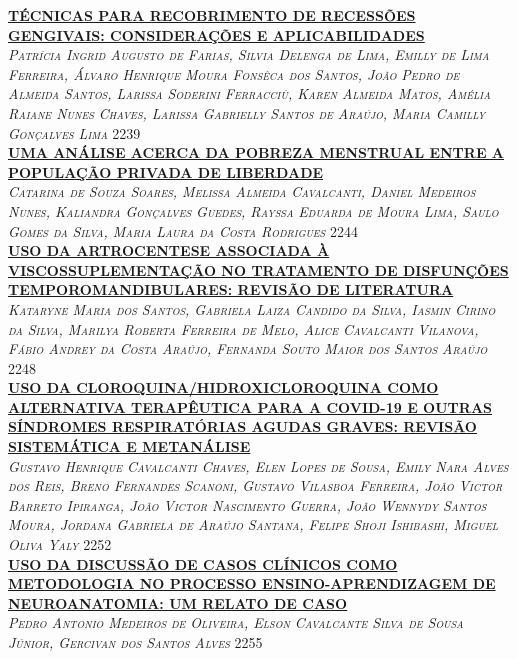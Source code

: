 \noindent \textsc{\hyperlink{trabalhos/251329.pdf.1}{\textbf{TÉCNICAS PARA RECOBRIMENTO DE RECESSÕES GENGIVAIS: CONSIDERAÇÕES E APLICABILIDADES}}}\\ 
\noindent \textsc{\textit{Patrícia Ingrid Augusto de Farias, Silvia Delenga de Lima, Emilly de Lima Ferreira, Álvaro Henrique Moura Fonsêca dos Santos, João Pedro de Almeida Santos, Larissa Soderini Ferracciù, Karen Almeida Matos, Amélia Raiane Nunes Chaves, Larissa Gabrielly Santos de Araújo, Maria Camilly Gonçalves Lima}} \hfill 2239\\ 

\noindent \textsc{\hyperlink{trabalhos/251701.pdf.1}{\textbf{UMA ANÁLISE ACERCA DA POBREZA MENSTRUAL ENTRE A POPULAÇÃO PRIVADA DE LIBERDADE}}}\\ 
\noindent \textsc{\textit{Catarina de Souza Soares, Melissa Almeida Cavalcanti, Daniel Medeiros Nunes, Kaliandra Gonçalves Guedes, Rayssa Eduarda de Moura Lima, Saulo Gomes da Silva, Maria Laura da Costa Rodrigues}} \hfill 2244\\ 

\noindent \textsc{\hyperlink{trabalhos/249981.pdf.1}{\textbf{USO DA ARTROCENTESE ASSOCIADA À VISCOSSUPLEMENTAÇÃO NO TRATAMENTO DE DISFUNÇÕES TEMPOROMANDIBULARES: REVISÃO DE LITERATURA }}}\\ 
\noindent \textsc{\textit{Kataryne Maria dos Santos, Gabriela Laiza Candido da Silva, Iasmin Cirino da Silva, Marilya Roberta Ferreira de Melo, Alice Cavalcanti Vilanova, Fábio Andrey da Costa Araújo, Fernanda Souto Maior dos Santos Araújo}} \hfill 2248\\ 

\noindent \textsc{\hyperlink{trabalhos/251674.pdf.1}{\textbf{USO DA CLOROQUINA/HIDROXICLOROQUINA COMO ALTERNATIVA TERAPÊUTICA PARA A COVID-19 E OUTRAS SÍNDROMES RESPIRATÓRIAS AGUDAS GRAVES: REVISÃO SISTEMÁTICA E METANÁLISE}}}\\ 
\noindent \textsc{\textit{Gustavo Henrique Cavalcanti Chaves, Elen Lopes de Sousa, Emily Nara Alves dos Reis, Breno Fernandes Scanoni, Gustavo Vilasboa Ferreira, João Victor Barreto Ipiranga, João Victor Nascimento Guerra, João Wennydy Santos Moura, Jordana Gabriela de Araújo Santana, Felipe Shoji Ishibashi, Miguel Oliva Yaly}} \hfill 2252\\ 

\noindent \textsc{\hyperlink{trabalhos/251778.pdf.1}{\textbf{USO DA DISCUSSÃO DE CASOS CLÍNICOS COMO METODOLOGIA NO PROCESSO ENSINO-APRENDIZAGEM DE NEUROANATOMIA: UM RELATO DE CASO}}}\\ 
\noindent \textsc{\textit{Pedro Antonio Medeiros de Oliveira, Elson Cavalcante Silva de Sousa Júnior, Gercivan dos Santos Alves}} \hfill 2255\\ 

